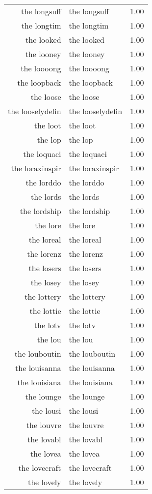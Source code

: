 \begin{table}[ht]
\begin{tabular}{rlr}
  the longsuff & the longsuff & 1.00 \\ 
  the longtim & the longtim & 1.00 \\ 
  the looked & the looked & 1.00 \\ 
  the looney & the looney & 1.00 \\ 
  the loooong & the loooong & 1.00 \\ 
  the loopback & the loopback & 1.00 \\ 
  the loose & the loose & 1.00 \\ 
  the looselydefin & the looselydefin & 1.00 \\ 
  the loot & the loot & 1.00 \\ 
  the lop & the lop & 1.00 \\ 
  the loquaci & the loquaci & 1.00 \\ 
  the loraxinspir & the loraxinspir & 1.00 \\ 
  the lorddo & the lorddo & 1.00 \\ 
  the lords & the lords & 1.00 \\ 
  the lordship & the lordship & 1.00 \\ 
  the lore & the lore & 1.00 \\ 
  the loreal & the loreal & 1.00 \\ 
  the lorenz & the lorenz & 1.00 \\ 
  the losers & the losers & 1.00 \\ 
  the losey & the losey & 1.00 \\ 
  the lottery & the lottery & 1.00 \\ 
  the lottie & the lottie & 1.00 \\ 
  the lotv & the lotv & 1.00 \\ 
  the lou & the lou & 1.00 \\ 
  the louboutin & the louboutin & 1.00 \\ 
  the louisanna & the louisanna & 1.00 \\ 
  the louisiana & the louisiana & 1.00 \\ 
  the lounge & the lounge & 1.00 \\ 
  the lousi & the lousi & 1.00 \\ 
  the louvre & the louvre & 1.00 \\ 
  the lovabl & the lovabl & 1.00 \\ 
  the lovea & the lovea & 1.00 \\ 
  the lovecraft & the lovecraft & 1.00 \\ 
  the lovely & the lovely & 1.00 \\ 

\end{tabular}
\end{table}
